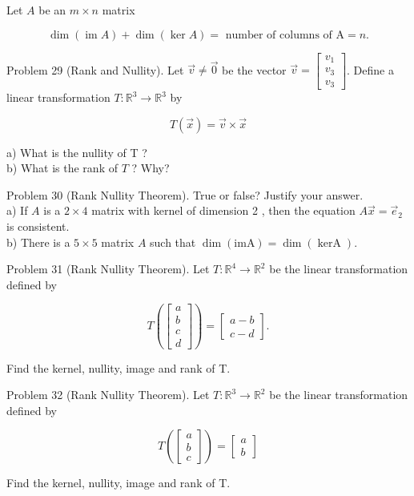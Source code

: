 \documentclass[10pt]{article}
\begin{document}
Let $A$ be an $m \times n$ matrix

$$
\operatorname{dim}(\operatorname{im} A)+\operatorname{dim}(\operatorname{ker} A)=\text { number of columns of } \mathrm{A}=n .
$$

Problem 29 (Rank and Nullity). Let $\vec{v} \neq \overrightarrow{0}$ be the vector $\vec{v}=\left[\begin{array}{c}v_{1} \\ v_{3} \\ v_{3}\end{array}\right]$. Define a linear transformation $T: \mathbb{R}^{3} \rightarrow \mathbb{R}^{3}$ by

$$
T(\vec{x})=\vec{v} \times \vec{x}
$$

a) What is the nullity of T ?\\
b) What is the rank of $T$ ? Why?

Problem 30 (Rank Nullity Theorem). True or false? Justify your answer.\\
a) If $A$ is a $2 \times 4$ matrix with kernel of dimension 2 , then the equation $A \vec{x}=\vec{e}_{2}$ is consistent.\\
b) There is a $5 \times 5$ matrix $A$ such that $\operatorname{dim}(\mathrm{imA})=\operatorname{dim}(\operatorname{kerA})$.

Problem 31 (Rank Nullity Theorem). Let $T: \mathbb{R}^{4} \rightarrow \mathbb{R}^{2}$ be the linear transformation defined by

$$
T\left(\left[\begin{array}{l}
a \\
b \\
c \\
d
\end{array}\right]\right)=\left[\begin{array}{l}
a-b \\
c-d
\end{array}\right] .
$$

Find the kernel, nullity, image and rank of T.

Problem 32 (Rank Nullity Theorem). Let $T: \mathbb{R}^{3} \rightarrow \mathbb{R}^{2}$ be the linear transformation defined by

$$
T\left(\left[\begin{array}{l}
a \\
b \\
c
\end{array}\right]\right)=\left[\begin{array}{l}
a \\
b
\end{array}\right]
$$

Find the kernel, nullity, image and rank of T.
\end{document}

